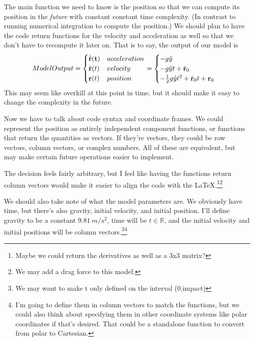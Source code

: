 \documentclass[12pt, letterpaper]{article}
\begin{document}
The main function we need to know is the position so that we can compute its position in the \textit{future} with constant constant time complexity. (In contrast to running numerical integration to compute the position.) We should plan to have the code return functions for the velocity and acceleration as well so that we don't have to recompute it later on. That is to say, the output of our model is 
\begin{align*}
Model Output =
\begin{cases} 
\dot{\ddot{\bf r}}(t) & acceleration \\
\ddot{\bf r}(t) & velocity \\
{\bf r}(t) & position
\end{cases}
= 
\begin{cases}
-g\hat{y} \\
-g\hat{y}t + \dot{\bf r}_0 \\
-\frac12g\hat{y}t^2 + \dot{\bf r}_0t + {\bf r}_0
\end{cases}
\end{align*}
This may seem like overkill at this point in time, but it should make it easy to change the complexity in the future. 

Now we have to talk about code syntax and coordinate frames. We could represent the position as entirely independent component functions, or functions that return the quantities as vectors. If they're vectors, they could be row vectors, column vectors, or complex numbers. All of these are equivalent, but may make certain future operations easier to implement. 

The decision feels fairly arbitrary, but I feel like having the functions return column vectors would make it easier to align the code with the LaTeX.\footnote{Maybe we could return the derivatives as well as a 3x3 matrix?}\footnote{We may add a drag force to this model.}

We should also take note of what the model parameters are. We obviously have time, but there's also gravity, initial velocity, and initial position. I'll define gravity to be a constant $9.81\ m/s^2$, time will be $t \in \mathbb{R}$, and the initial velocity and initial positions will be column vectors.\footnote{We may want to make t only defined on the interval (0,impact)}\footnote{I'm going to define them in column vectors to match the functions, but we could also think about specifying them in other coordinate systems like polar coordinates if that's desired. That could be a standalone function to convert from polar to Cartesian.} 
\end{document}
